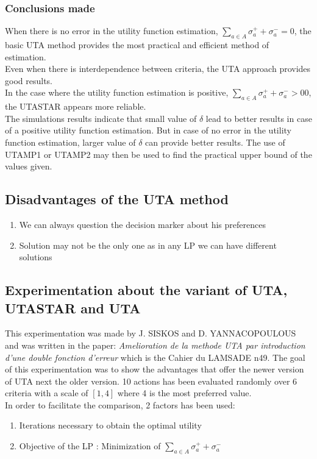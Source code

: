 \documentclass{report}
\begin{document}
\subsubsection{Conclusions made}
When there is no error in the utility function estimation, $ \sum_{a \in A} \sigma _{a}^{+} + \sigma _{a}^{-} = 0$, the basic UTA method provides the most practical and efficient method of estimation. \\
Even when there is interdependence between criteria, the UTA approach provides good results. \\
In the case where the utility function estimation is positive, $ \sum_{a \in A} \sigma _{a}^{+} + \sigma _{a}^{-} >0 0$, the UTASTAR appears more reliable.\\
The simulations results indicate that small value of $\delta$  lead to better results in case of a positive utility function estimation. But in case of no error in the utility function estimation, larger value of $\delta$ can provide better results. The use of UTAMP1 or UTAMP2 may then be used to find the practical upper bound of the values given.  

\subsection{Disadvantages of the UTA method}
\begin{enumerate}
\item We can always question the decision marker about his preferences
\item Solution may not be the only one as in any LP we can have different solutions
\end{enumerate}

\subsection{Experimentation about the variant of UTA, UTASTAR and UTA}
This experimentation was made by J. SISKOS and D. YANNACOPOULOUS and was written in the paper: \textit{Amelioration de la methode UTA par introduction d'une double fonction d'erreur} which is the Cahier du LAMSADE n49. The goal of this experimentation was to show the advantages that offer the newer version of UTA next the older version. 10 actions has been evaluated randomly over 6 criteria with a scale of $[1,4]$ where 4 is the most preferred value.\\

In order to facilitate the comparison, 2 factors has been used:
\begin{enumerate}
\item Iterations necessary to obtain the optimal utility
\item Objective of the LP : Minimization of $ \sum_{a \in A} \sigma _{a}^{+} + \sigma _{a}^{-} $ 
\end{enumerate}
\end{document}
